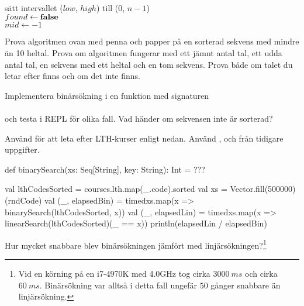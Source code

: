 \begin{algorithm}[H]

 sätt intervallet ($low$, $high$) till ($0$, $n - 1$) \\
 $found \leftarrow \bf{false}$ \\
 $mid \leftarrow -1$\\
\end{algorithm}

\Subtask Prova algoritmen ovan med penna och papper på en sorterad sekvens med mindre än 10 heltal. Prova om algoritmen fungerar med ett jämnt antal tal, ett udda antal tal, en sekvens med ett heltal och en tom sekvens. Prova både om talet du letar efter finns och om det inte finns.

\Subtask Implementera binärsökning i en funktion med signaturen\\
\\
och testa i REPL för olika fall. Vad händer om sekvensen inte är sorterad?

\Subtask Använd  för att leta efter LTH-kurser enligt nedan. Använd ,  och  från tidigare uppgifter.
\begin{Code}
def binarySearch(xs: Seq[String], key: String): Int = ???

val lthCodesSorted = courses.lth.map(_.code).sorted
val xs = Vector.fill(500000)(rndCode)
val (_, elapsedBin) =
  timed{xs.map(x => binarySearch(lthCodesSorted, x))}
val (_, elapsedLin) =
  timed{xs.map(x => linearSearch(lthCodesSorted)(_ == x))}
println(elapsedLin / elapsedBin)
\end{Code}


\Subtask Hur mycket snabbare blev binärsökningen jämfört med linjärsökningen?\footnote{Vid en körning på en i7-4970K med 4.0GHz tog  cirka $3000~ms$ och  cirka $60~ms$. Binärsökning var alltså i detta fall ungefär $50$ gånger snabbare än linjärsökning.}


